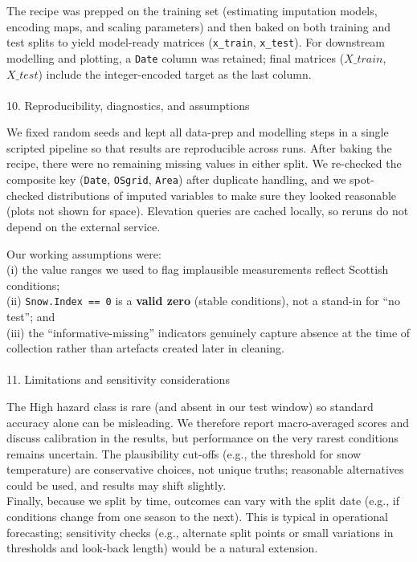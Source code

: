 \documentclass[
  letterpaper,
  DIV=11,
  numbers=noendperiod]{scrartcl}
\makeatletter
\let\oldparagraph\paragraph
\renewcommand{\paragraph}{
    \@ifstar
      \xxxParagraphStar
      \xxxParagraphNoStar
  }
\newcommand{\xxxParagraphStar}[1]{\oldparagraph*{#1}\mbox{}}
\newcommand{\xxxParagraphNoStar}[1]{\oldparagraph{#1}\mbox{}}
\makeatother
\begin{document}
The recipe was prepped on the training set (estimating imputation
models, encoding maps, and scaling parameters) and then baked on both
training and test splits to yield model-ready matrices
(\texttt{x\_train}, \texttt{x\_test}). For downstream modelling and
plotting, a \texttt{Date} column was retained; final matrices
(\(X\_{train}\), \(X\_{test}\)) include the integer-encoded target as
the last column.

\paragraph{10. Reproducibility, diagnostics, and
assumptions}\label{reproducibility-diagnostics-and-assumptions}

We fixed random seeds and kept all data-prep and modelling steps in a
single scripted pipeline so that results are reproducible across runs.
After baking the recipe, there were no remaining missing values in
either split. We re-checked the composite key (\texttt{Date},
\texttt{OSgrid}, \texttt{Area}) after duplicate handling, and we
spot-checked distributions of imputed variables to make sure they looked
reasonable (plots not shown for space). Elevation queries are cached
locally, so reruns do not depend on the external service.

Our working assumptions were:\\
(i) the value ranges we used to flag implausible measurements reflect
Scottish conditions;\\
(ii) \texttt{Snow.Index\ ==\ 0} is a \textbf{valid zero} (stable
conditions), not a stand-in for ``no test''; and\\
(iii) the ``informative-missing'' indicators genuinely capture absence
at the time of collection rather than artefacts created later in
cleaning.

\paragraph{11. Limitations and sensitivity
considerations}\label{limitations-and-sensitivity-considerations}

The High hazard class is rare (and absent in our test window) so
standard accuracy alone can be misleading. We therefore report
macro-averaged scores and discuss calibration in the results, but
performance on the very rarest conditions remains uncertain. The
plausibility cut-offs (e.g., the threshold for snow temperature) are
conservative choices, not unique truths; reasonable alternatives could
be used, and results may shift slightly.\\
Finally, because we split by time, outcomes can vary with the split date
(e.g., if conditions change from one season to the next). This is
typical in operational forecasting; sensitivity checks (e.g., alternate
split points or small variations in thresholds and look-back length)
would be a natural extension.
\end{document}

